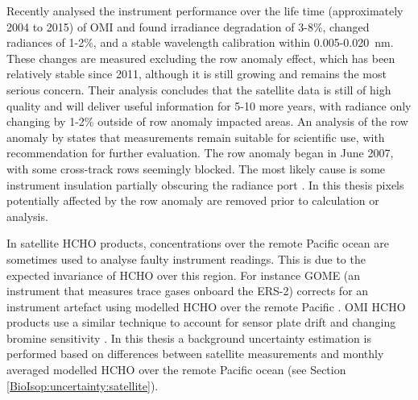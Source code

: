     
    
    
    Recently \textcite{Schenkeveld2017} analysed the instrument performance over the life time (approximately 2004 to 2015) of OMI and found irradiance degradation of 3-8\%, changed radiances of 1-2\%, and a stable wavelength calibration within 0.005-0.020~nm.
    These changes are measured excluding the row anomaly effect, which has been relatively stable since 2011, although it is still growing and remains the most serious concern.
    Their analysis concludes that the satellite data is still of high quality and will deliver useful information for 5-10 more years, with radiance only changing by 1-2\% outside of row anomaly impacted areas.
    An analysis of the row anomaly by \textcite{Huang2018} states that measurements remain suitable for scientific use, with recommendation for further evaluation.
    The row anomaly began in June 2007, with some cross-track rows seemingly blocked. 
    The most likely cause is some instrument insulation partially obscuring the radiance port \parencite{Schenkeveld2017}.
    In this thesis pixels potentially affected by the row anomaly are removed prior to calculation or analysis.
    
    In satellite HCHO products, concentrations over the remote Pacific ocean are sometimes used to analyse faulty instrument readings.
    This is due to the expected invariance of HCHO over this region.
    For instance GOME (an instrument that measures trace gases onboard the ERS-2) corrects for an instrument artefact using modelled HCHO over the remote Pacific \parencite{Shim2005}.
    OMI HCHO products use a similar technique to account for sensor plate drift and changing bromine sensitivity \parencite{Abad2015}.
    In this thesis a background uncertainty estimation is performed based on differences between satellite measurements and monthly averaged modelled HCHO over the remote Pacific ocean (see Section \ref{BioIsop:uncertainty:satellite}).
    
